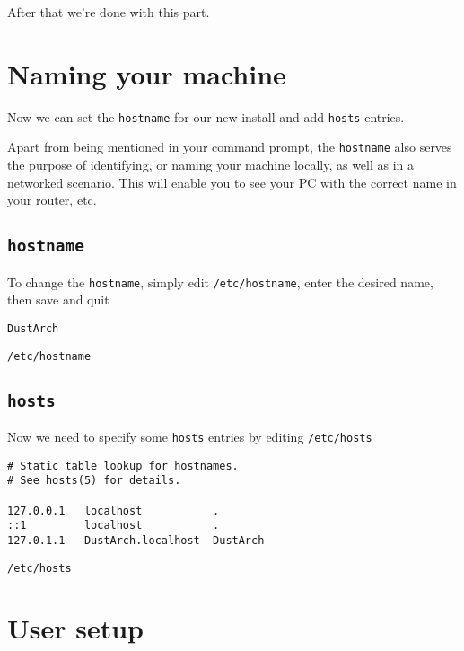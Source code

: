 \documentclass[10pt]{dustdoc}
\begin{document}
After that we’re done with this part.

\section{Naming your machine}
\label{sec:naming-your-machine}

Now we can set the \texttt{hostname} for our new install and add \texttt{hosts} entries.

Apart from being mentioned in your command prompt, the \texttt{hostname} also serves the purpose of identifying, or naming your machine locally, as well as in a networked scenario.  This will enable you to see your PC with the correct name in your router, etc.

\subsection{\texttt{hostname}}
\label{sec:hostname}

To change the \texttt{hostname}, simply edit \texttt{/etc/hostname}, enter the desired name, then save and quit

\begin{mintedlisting}
    \begin{verbatim}
DustArch
    \end{verbatim}

    \caption{\texttt{/etc/hostname}}
\end{mintedlisting}

\subsection{\texttt{hosts}}
\label{sec:hosts}

Now we need to specify some \texttt{hosts} entries by editing \texttt{/etc/hosts}

\begin{mintedlisting}
    \begin{verbatim}
# Static table lookup for hostnames.
# See hosts(5) for details.

127.0.0.1   localhost           .
::1         localhost           .
127.0.1.1   DustArch.localhost  DustArch
    \end{verbatim}

    \caption{\texttt{/etc/hosts}}
\end{mintedlisting}

\section{User setup}
\label{sec:user-setup}
\end{document}
